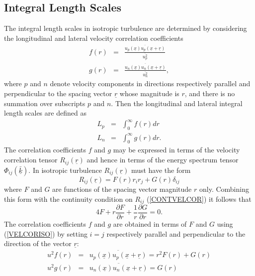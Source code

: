 \documentclass[dvips]{article}
\begin{document}
\subsection{Integral Length Scales}
The integral length scales in isotropic turbulence are determined by
considering the longitudinal and lateral velocity correlation coefficients
\begin{eqnarray}
f(r) & = &
\frac{\overline{u_{p}(\underline{x})u_{p}(\underline{x}+\underline{r})}}
{\overline{u^{2}_{p}}} \nonumber \\
g(r) & = &
\frac{\overline{u_{n}(\underline{x})u_{n}(\underline{x}+\underline{r})}}
{\overline{u^{2}_{n}}},
\label{FANDGDEF}
\end{eqnarray}
where $p$ and $n$ denote velocity components in directions respectively
parallel and perpendicular to the spacing vector $\underline{r}$ whose
magnitude is $r$,
and there is no summation over subscripts $p$ and $n$.  Then the
longitudinal and lateral integral length scales are defined as
\begin{eqnarray}
L_{p} & = & \int_{0}^{\infty} f(r) dr \nonumber \\
L_{n} & = & \int_{0}^{\infty} g(r) dr.
\label{LENDEFS}
\end{eqnarray}
The correlation coefficients $f$ and $g$ may be expressed in terms of the
velocity correlation tensor $R_{ij}(\underline{r})$ and hence in terms
of the energy spectrum tensor $\Phi_{ij}(\underline{\bar{k}})$.
In isotropic turbulence $R_{ij}(\underline{r})$ must have the form
\cite{batchelor53}
\begin{equation}
R_{ij}(\underline{r}) = F(r)r_{i}r_{j} + G(r)\delta_{ij}
\label{VELCORISO}
\end{equation}
where $F$ and $G$ are functions of the spacing vector magnitude $r$ only.
Combining this form with the continuity condition on $R_{ij}$
(\ref{CONTVELCOR}) it follows that 
\begin{equation}
4F + r\frac{\partial F}{\partial r} +
\frac{1}{r}\frac{\partial G}{\partial r} = 0.
\label{VELCONTISO}
\end{equation}
The correlation coefficients $f$ and $g$ are obtained in terms of $F$
and $G$ using 
(\ref{VELCORISO}) by setting $i=j$ respectively parallel and perpendicular
to the direction of the vector $\underline{r}$:
\begin{eqnarray}
u^{2}f(r) & = &
\overline{u_{p}(\underline{x})u_{p}(\underline{x}+\underline{r})}
= r^{2}F(r) + G(r) \nonumber \\[2mm]
u^{2}g(r) & = &
\overline{u_{n}(\underline{x})u_{n}(\underline{x}+\underline{r})}
= G(r) 
\label{FANDG}
\end{eqnarray}
\end{document}
